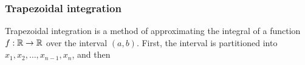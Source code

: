 \documentclass{amsart}[12pt]
\begin{document}








\subsubsection{Trapezoidal integration}

Trapezoidal integration is a method of approximating the integral of a function $f: {\mathbb{R}} \to {\mathbb{R}}$ over the
interval $(a, b)$. First, the interval is partitioned into $x_1, x_2, \ldots, x_{n-1}, x_n$, and then
\end{document}
